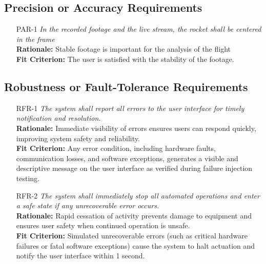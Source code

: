 \documentclass[12pt]{article}
\begin{document}
\subsection{Precision or Accuracy Requirements}
\begin{itemize}[leftmargin=*]
  \item[PAR-1] \emph{In the recorded footage and the live stream, the rocket shall be
          centered in the frame}\\[2mm]
        \textbf{Rationale:} Stable footage is important for the analysis of the flight\\
        \textbf{Fit Criterion:} The user is satisfied with the stability of the footage.
\end{itemize}

\subsection{Robustness or Fault-Tolerance Requirements}
\begin{itemize}[leftmargin=*]
  \item[RFR-1] \emph{The system shall report all errors to the user interface for
          timely notification and resolution.}\\[2mm]
        \textbf{Rationale:} Immediate visibility of errors ensures users can respond quickly, improving system safety and reliability.\\
        \textbf{Fit Criterion:} Any error condition, including hardware faults, communication losses, and software exceptions, generates a visible and descriptive message on the user interface as verified during failure injection testing.
  \item[RFR-2] \emph{The system shall immediately stop all automated operations and
          enter a safe state if any unrecoverable error occurs.}\\[2mm]
        \textbf{Rationale:} Rapid cessation of activity prevents damage to equipment and ensures user safety when continued operation is unsafe.\\
        \textbf{Fit Criterion:} Simulated unrecoverable errors (such as critical hardware failures or fatal software exceptions) cause the system to halt actuation and notify the user interface within 1 second.
\end{itemize}
\end{document}
